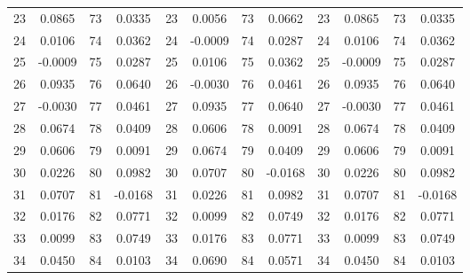 \documentclass{article}
\begin{document}
\begin{longtable}[c]{cccccccccccc}
	23        & 0.0865       & 73            & 0.0335            & 23       & 0.0056        & 73            & 0.0662            & 23       & 0.0865        & 73            & 0.0335            \\
	24        & 0.0106       & 74            & 0.0362            & 24       & -0.0009       & 74            & 0.0287            & 24       & 0.0106        & 74            & 0.0362            \\
	25        & -0.0009      & 75            & 0.0287            & 25       & 0.0106        & 75            & 0.0362            & 25       & -0.0009       & 75            & 0.0287            \\
	26        & 0.0935       & 76            & 0.0640            & 26       & -0.0030       & 76            & 0.0461            & 26       & 0.0935        & 76            & 0.0640            \\
	27        & -0.0030      & 77            & 0.0461            & 27       & 0.0935        & 77            & 0.0640            & 27       & -0.0030       & 77            & 0.0461            \\
	28        & 0.0674       & 78            & 0.0409            & 28       & 0.0606        & 78            & 0.0091            & 28       & 0.0674        & 78            & 0.0409            \\
	29        & 0.0606       & 79            & 0.0091            & 29       & 0.0674        & 79            & 0.0409            & 29       & 0.0606        & 79            & 0.0091            \\
	30        & 0.0226       & 80            & 0.0982            & 30       & 0.0707        & 80            & -0.0168           & 30       & 0.0226        & 80            & 0.0982            \\
	31        & 0.0707       & 81            & -0.0168           & 31       & 0.0226        & 81            & 0.0982            & 31       & 0.0707        & 81            & -0.0168           \\
	32        & 0.0176       & 82            & 0.0771            & 32       & 0.0099        & 82            & 0.0749            & 32       & 0.0176        & 82            & 0.0771            \\
	33        & 0.0099       & 83            & 0.0749            & 33       & 0.0176        & 83            & 0.0771            & 33       & 0.0099        & 83            & 0.0749            \\
	34        & 0.0450       & 84            & 0.0103            & 34       & 0.0690        & 84            & 0.0571            & 34       & 0.0450        & 84            & 0.0103            \\

\end{longtable}
\end{document}
